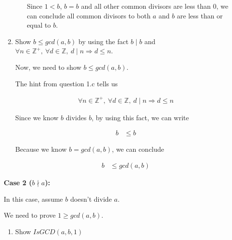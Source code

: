 \documentclass[12pt]{article}
\begin{document}
\begin{enumerate}[a.]
\begin{mdframed}
\begin{enumerate}[1.]
\begin{itemize}
\begin{mdframed}
                Since $1 < b$, $b = b$ and all other common divisors are less than 0,
                we can conclude all common divisors to both $a$ and $b$ are less than or equal to $b$.

                \end{mdframed}
            \end{itemize}

            \item Show $b \leq gcd(a,b)$ by using the fact $b \mid b$ and $\forall n \in
            \mathbb{Z}^{+},\:\forall d \in \mathbb{Z},\:d \mid n \Rightarrow d \leq n$.

            \begin{mdframed}

            Now, we need to show $b \leq gcd(a,b)$.

            \bigskip

            The hint from question 1.c tells us

            \begin{align}
                \forall n \in \mathbb{Z}^{+},\:\forall d \in \mathbb{Z},\:d \mid n \Rightarrow d \leq n
            \end{align}

            Since we know $b$ divides $b$, by using this fact, we can write

            \begin{align}
                b &\leq b
            \end{align}

            Because we know $b = gcd(a,b)$, we can conclude

            \begin{align}
                b &\leq gcd(a,b)
            \end{align}

            \end{mdframed}
        \end{enumerate}

        \bigskip

        \textbf{Case 2 ($b \nmid a$):}

        \bigskip

        In this case, assume $b$ doesn't divide $a$.

        \bigskip

        We need to prove $1 \geq gcd(a,b)$.

        \bigskip

        \begin{enumerate}[1.]
            \item Show $IsGCD(a,b,1)$


\end{enumerate}
\end{mdframed}
\end{enumerate}
\end{document}
